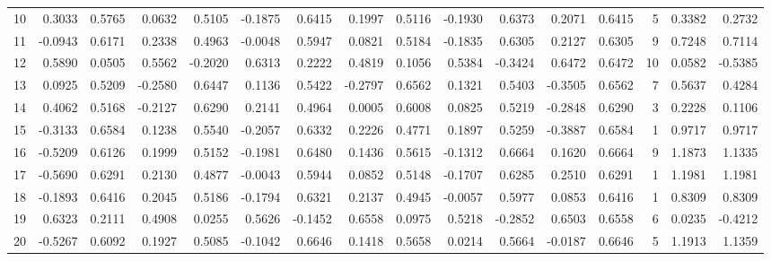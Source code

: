 \begin{tabular}{lrrrrrrrrrrrrrrr}
10  &      0.3033 &  0.5765 &  0.0632 &  0.5105 & -0.1875 &  0.6415 &  0.1997 &  0.5116 & -0.1930 &  0.6373 &   0.2071 &     0.6415 &      5 &                    0.3382 &                     0.2732 \\
11  &     -0.0943 &  0.6171 &  0.2338 &  0.4963 & -0.0048 &  0.5947 &  0.0821 &  0.5184 & -0.1835 &  0.6305 &   0.2127 &     0.6305 &      9 &                    0.7248 &                     0.7114 \\
12  &      0.5890 &  0.0505 &  0.5562 & -0.2020 &  0.6313 &  0.2222 &  0.4819 &  0.1056 &  0.5384 & -0.3424 &   0.6472 &     0.6472 &     10 &                    0.0582 &                    -0.5385 \\
13  &      0.0925 &  0.5209 & -0.2580 &  0.6447 &  0.1136 &  0.5422 & -0.2797 &  0.6562 &  0.1321 &  0.5403 &  -0.3505 &     0.6562 &      7 &                    0.5637 &                     0.4284 \\
14  &      0.4062 &  0.5168 & -0.2127 &  0.6290 &  0.2141 &  0.4964 &  0.0005 &  0.6008 &  0.0825 &  0.5219 &  -0.2848 &     0.6290 &      3 &                    0.2228 &                     0.1106 \\
15  &     -0.3133 &  0.6584 &  0.1238 &  0.5540 & -0.2057 &  0.6332 &  0.2226 &  0.4771 &  0.1897 &  0.5259 &  -0.3887 &     0.6584 &      1 &                    0.9717 &                     0.9717 \\
16  &     -0.5209 &  0.6126 &  0.1999 &  0.5152 & -0.1981 &  0.6480 &  0.1436 &  0.5615 & -0.1312 &  0.6664 &   0.1620 &     0.6664 &      9 &                    1.1873 &                     1.1335 \\
17  &     -0.5690 &  0.6291 &  0.2130 &  0.4877 & -0.0043 &  0.5944 &  0.0852 &  0.5148 & -0.1707 &  0.6285 &   0.2510 &     0.6291 &      1 &                    1.1981 &                     1.1981 \\
18  &     -0.1893 &  0.6416 &  0.2045 &  0.5186 & -0.1794 &  0.6321 &  0.2137 &  0.4945 & -0.0057 &  0.5977 &   0.0853 &     0.6416 &      1 &                    0.8309 &                     0.8309 \\
19  &      0.6323 &  0.2111 &  0.4908 &  0.0255 &  0.5626 & -0.1452 &  0.6558 &  0.0975 &  0.5218 & -0.2852 &   0.6503 &     0.6558 &      6 &                    0.0235 &                    -0.4212 \\
20  &     -0.5267 &  0.6092 &  0.1927 &  0.5085 & -0.1042 &  0.6646 &  0.1418 &  0.5658 &  0.0214 &  0.5664 &  -0.0187 &     0.6646 &      5 &                    1.1913 &                     1.1359 \\

\end{tabular}
